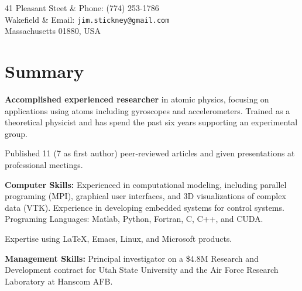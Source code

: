 \documentclass[overlapped,line,letterpaper]{res}
\begin{document}

\setlength{\leftmargini}{0em}
\renewcommand{\labelitemi}{}

\renewcommand{\namefont}{\large\textbf}



\begin{resume}

\begin{ncolumn}{2}

41 Pleasant Steet & Phone:  (774) 253-1786 \\
Wakefield               & Email: {\tt jim.stickney@gmail.com} \\
Massachusetts 01880, USA
\end{ncolumn}



\section{\bf Summary}

 {\bf Accomplished experienced researcher} in atomic physics, focusing on applications using atoms including gyroscopes and accelerometers.  Trained as a theoretical physicist and has spend the past six years supporting an experimental group.

Published 11 (7 as first author) peer-reviewed articles and given presentations at professional meetings.


 {\bf Computer Skills:} Experienced in computational modeling, including parallel programing (MPI), graphical user interfaces, and 3D visualizations of complex data (VTK).  Experience in developing embedded systems for control systems.  
Programing Languages: Matlab, Python, Fortran, C, C++, and CUDA.

Expertise using \LaTeX, Emacs, Linux, and Microsoft products. 


 {\bf Management Skills:} Principal investigator on a \$4.8M Research and Development contract for Utah State University and the Air Force
 Research Laboratory at Hanscom AFB.




\end{resume}
\end{document}
